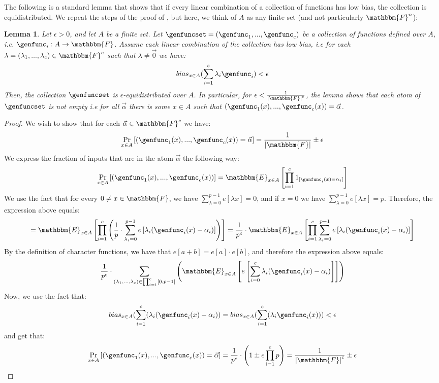 \documentclass[10pt,a4paper]{article}
\newtheorem{lemma}[theorem]{Lemma}
\newcommand{\parens}[1]{\left( #1 \right)}
\newcommand{\sparens}[1]{\left[ #1 \right]}
\newcommand{\expectation}[2]{\mathbbm{E}_{#1} \sparens{#2}}
\newcommand{\basefield}[0]{\mathbbm{F}}
\newcommand{\blocklength}[0]{n}
\newcommand{\field}[0]{\basefield^{\blocklength}}
\newcommand{\basefieldsize}[0]{p}
\newcommand{\charfunc}[1]{e \sparens{#1}}
\newcommand{\funcdef}[3]{#1:#2\rightarrow#3}
\newcommand{\relbias}[2]{bias_{#1}{({#2})}}
\newcommand{\abs}[1]{\left| #1 \right|}
\newcommand{\prex}[2]{\Pr_{#1}\left[ #2 \right]}
\begin{document}
The following is a standard lemma that shows that if every linear combination of a collection of functions has low bias, the collection is equidistributed.
We repeat the steps of the proof of \cite[Lemma 7.24]{book}, but here, we think of $A$ as any finite set (and not particularly $\field$):
\begin{lemma}\label{every-linear-combination-has-low-bias-implies-equidistribution}
Let $\epsilon > 0$, and let $A$ be a finite set.
Let $\genfuncset = (\genfunc_1,...,\genfunc_c)$ be a collection of functions defined over $A$, i.e. $\funcdef{\genfunc_i}{A}{\basefield}$.
Assume each linear combination of the collection has low bias, i.e for each $\lambda = (\lambda_1,...,\lambda_c) \in \basefield^c$ such that $\lambda \neq \vec{0}$ we have:
\[
    \relbias{x \in A}{\sum_{i=1}^{c}{\lambda_i \genfunc_i}} < \epsilon
\]
Then, the collection $\genfuncset$ is $\epsilon$-equidistributed over $A$.
\newline
In particular, for $\epsilon < \frac{1}{\abs{\basefield}^c}$, the lemma shows that each atom of $\genfuncset$ is not empty i.e for all $\vec{\alpha}$ there is some $x \in A$ such that $(\genfunc_1(x),...,\genfunc_c(x)) = \vec{\alpha}$.
\end{lemma}
\begin{proof}
    We wish to show that for each $\vec{\alpha} \in \basefield^c$ we have:
    \[
        \prex{x \in A}{(\genfunc_1(x),...,\genfunc_c(x)) = \vec{\alpha}} = \frac{1}{\abs{\basefield}} \pm \epsilon
    \]
    We express the fraction of inputs that are in the atom $\vec{\alpha}$ the following way:
    \[
        \prex{x \in A}{(\genfunc_1(x),...,\genfunc_c(x))} =
        \expectation{x \in A}{\prod_{i=1}^c {1_{[\genfunc_i(x) = \alpha_i]}}}
    \]
    We use the fact that for every $0 \neq x \in \basefield$, we have $\sum_{\lambda = 0}^{\basefieldsize - 1} \charfunc{\lambda x} = 0$,
    and if $x = 0$ we have $\sum_{\lambda = 0}^{\basefieldsize - 1} \charfunc{\lambda x} = \basefieldsize$.
    Therefore, the expression above equals:
    \[
        =\expectation{x \in A}{\prod_{i=1}^c \parens {{\frac{1}{\basefieldsize} \cdot \sum_{\lambda_i = 0}^{\basefieldsize - 1} {\charfunc{\lambda_i (\genfunc_i(x) - \alpha_i)}}}}} =\\
        \frac{1}{\basefieldsize^c} \cdot {\expectation{x \in A}{\prod_{i=1}^c \sum_{\lambda_i = 0}^{\basefieldsize - 1} {\charfunc{\lambda_i (\genfunc_i(x) - \alpha_i)}}}}
    \]
    By the definition of character functions, we have that $\charfunc{a+b} = \charfunc{a} \cdot \charfunc{b}$, and therefore the expression above equals:
    \[
        \frac{1}{\basefieldsize^c} \cdot \sum_{(\lambda_1,...,\lambda_c) \in \prod_{i=1}^c [0, \basefieldsize - 1]} \parens{\expectation{x \in A}{\charfunc{\sum_{i = 0}^{c} {\lambda_i (\genfunc_i(x) - \alpha_i)}}}}
    \]
    Now, we use the fact that:
    \[
        \relbias{x \in A}{\sum_{i=1}^c (\lambda_i (\genfunc_i(x) -\alpha_i)} = \relbias{x \in A}{\sum_{i=1}^c (\lambda_i \genfunc_i(x))} < \epsilon
    \]
    and get that:
    \[
        \prex{x \in A}{(\genfunc_1(x),...,\genfunc_c(x)) = \vec{\alpha}} = \frac{1}{\basefieldsize^c} \cdot \parens{1 \pm \epsilon \prod_{i=1}^c{\basefieldsize}} = \frac{1}{\abs{\basefield}^c} \pm \epsilon
    \]
\end{proof}
\end{document}
